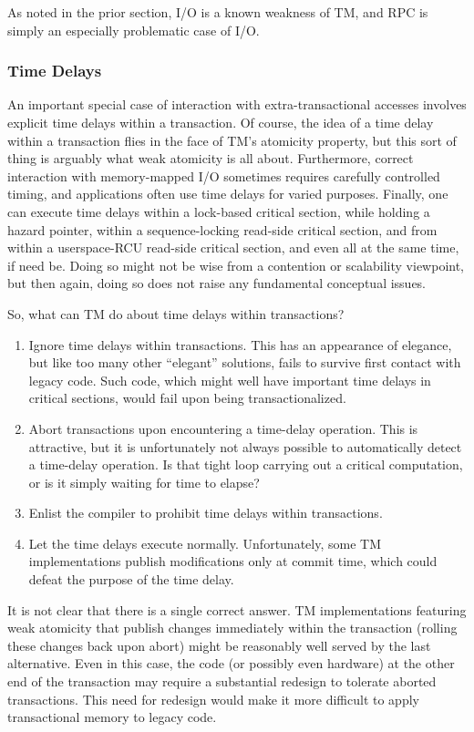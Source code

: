 As noted in the prior section, I/O is a known weakness of TM, and RPC
is simply an especially problematic case of I/O.

\subsubsection{Time Delays}
\label{sec:future:Time Delays}

An important special case of interaction with extra-transactional accesses
involves explicit time delays within a transaction.
Of course, the idea of a time delay within a transaction flies in the
face of TM's atomicity property, but this sort of thing is arguably what
weak atomicity is all about.
Furthermore, correct interaction with memory-mapped I/O sometimes requires
carefully controlled timing, and applications often use time delays
for varied purposes.
Finally, one can execute time delays within a lock-based critical section,
while holding a hazard pointer, within a sequence-locking read-side
critical section, and from within a userspace-RCU read-side critical
section, and even all at the same time, if need be.
Doing so might not be wise from a contention or scalability viewpoint,
but then again, doing so does not raise any fundamental conceptual issues.

So, what can TM do about time delays within transactions?

\begin{enumerate}
\item	Ignore time delays within transactions.
	This has an appearance of elegance, but like too many other
	``elegant'' solutions, fails to survive first contact with
	legacy code.
	Such code, which might well have important time delays in critical
	sections, would fail upon being transactionalized.
\item	Abort transactions upon encountering a time-delay operation.
	This is attractive, but it is unfortunately not always possible
	to automatically detect a time-delay operation.
	Is that tight loop carrying out a critical computation, or is it
	simply waiting for time to elapse?
\item	Enlist the compiler to prohibit time delays within transactions.
\item	Let the time delays execute normally.
	Unfortunately, some TM implementations publish modifications only
	at commit time, which could defeat the purpose of the time delay.
\end{enumerate}

It is not clear that there is a single correct answer.
TM implementations featuring weak atomicity that publish changes
immediately within the transaction (rolling these changes back upon abort)
might be reasonably well served by the last alternative.
Even in this case, the code (or possibly even hardware) at the other
end of the transaction may require a substantial redesign to tolerate
aborted transactions.
This need for redesign would make it more difficult to apply transactional
memory to legacy code.

